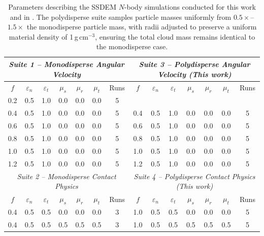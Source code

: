 \documentclass[fleqn,usenatbib]{mnras}
\begin{document}
\begin{table}
    \centering
    \caption{Parameters describing the SSDEM $N$-body simulations conducted for this work and in \citet{Barnes2025}. The polydisperse suite samples particle masses uniformly from $0.5\times$--$1.5\times$ the monodisperse particle mass, with radii adjusted to preserve a uniform material density of 1\,g\,cm$^{-3}$, ensuring the total cloud mass remains identical to the monodisperse case.}
    \label{tab:particle_setup}
    \begin{tabular}{ccccccc|ccccccc}
        \hline
        \multicolumn{7}{c|}{\textit{Suite 1 -- Monodisperse Angular Velocity \citep{Barnes2025}}} &
        \multicolumn{7}{c}{\textit{Suite 3 -- Polydisperse Angular Velocity (This work)}} \\
        \hline
        $f$ & $\varepsilon_{n}$ & $\varepsilon_{t}$ & $\mu_{s}$ & $\mu_{r}$ & $\mu_{t}$ & Runs &
        $f$ & $\varepsilon_{n}$ & $\varepsilon_{t}$ & $\mu_{s}$ & $\mu_{r}$ & $\mu_{t}$ & Runs \\
        \hline
        0.2 & 0.5 & 1.0 & 0.0 & 0.0 & 0.0 & 5 & \multicolumn{7}{c}{} \\
        0.4 & 0.5 & 1.0 & 0.0 & 0.0 & 0.0 & 5 & 0.4 & 0.5 & 1.0 & 0.0 & 0.0 & 0.0 & 5 \\
        0.6 & 0.5 & 1.0 & 0.0 & 0.0 & 0.0 & 5 & 0.6 & 0.5 & 1.0 & 0.0 & 0.0 & 0.0 & 5 \\
        0.8 & 0.5 & 1.0 & 0.0 & 0.0 & 0.0 & 5 & 0.8 & 0.5 & 1.0 & 0.0 & 0.0 & 0.0 & 5 \\
        1.0 & 0.5 & 1.0 & 0.0 & 0.0 & 0.0 & 5 & 1.0 & 0.5 & 1.0 & 0.0 & 0.0 & 0.0 & 5 \\
        1.2 & 0.5 & 1.0 & 0.0 & 0.0 & 0.0 & 5 & 1.2 & 0.5 & 1.0 & 0.0 & 0.0 & 0.0 & 5 \\
        \hline
        \multicolumn{7}{c|}{\textit{Suite 2 -- Monodisperse Contact Physics \citep{Barnes2025}}} &
        \multicolumn{7}{c}{\textit{Suite 4 -- Polydisperse Contact Physics (This work)}} \\
        \hline
        $f$ & $\varepsilon_{n}$ & $\varepsilon_{t}$ & $\mu_{s}$ & $\mu_{r}$ & $\mu_{t}$ & Runs &
        $f$ & $\varepsilon_{n}$ & $\varepsilon_{t}$ & $\mu_{s}$ & $\mu_{r}$ & $\mu_{t}$ & Runs \\
        \hline
        0.4 & 0.5 & 0.5 & 0.0 & 0.0 & 0.0 & 3 & 1.0 & 0.5 & 0.5 & 0.0 & 0.0 & 0.0 & 5 \\
        0.4 & 0.5 & 0.5 & 0.5 & 0.5 & 0.5 & 3 & 1.0 & 0.5 & 0.5 & 0.5 & 0.5 & 0.5 & 5 \\

\end{tabular}
\end{table}
\end{document}
